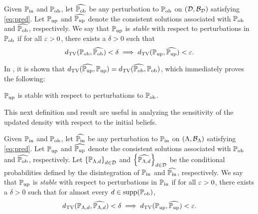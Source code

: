 \begin{defn}\label{defn:stableobs}
  Given $\operatorname*{\mathbb{P}_{in}}$ and $\operatorname*{\mathbb{P}_{ob}}$, let $\widehat{\operatorname*{\mathbb{P}_{ob}}}$ be any perturbation to $\operatorname*{\mathbb{P}_{ob}}$ on $(\mathcal{D}, \mathcal{B}_{\mathcal{D}})$ satisfying \eqref{eq:pred}.
  Let $\operatorname*{\mathbb{P}_{up}}$ and $\widehat{\operatorname*{\mathbb{P}_{up}}}$ denote the consistent solutions associated with $\operatorname*{\mathbb{P}_{ob}}$ and $\widehat{\operatorname*{\mathbb{P}_{ob}}}$, respectively.
  We say that $\operatorname*{\mathbb{P}_{up}}$ is \emph{stable} with respect to perturbations in $\operatorname*{\mathbb{P}_{ob}}$ if for all $\varepsilon > 0$, there exists a $\delta > 0$ such that
  \begin{equation}
    d_{\text{TV}} (\operatorname*{\mathbb{P}_{ob}}, \widehat{\operatorname*{\mathbb{P}_{ob}}}) < \delta \implies d_{\text{TV}} (\operatorname*{\mathbb{P}_{up}}, \widehat{\operatorname*{\mathbb{P}_{up}}}) < \varepsilon.
  \end{equation}
\end{defn}

In \cite{BJW18}, it is shown that $d_{\text{TV}} (\widehat{\operatorname*{\mathbb{P}_{up}}}, \operatorname*{\mathbb{P}_{up}}) = d_{\text{TV}} (\widehat{\operatorname*{\mathbb{P}_{ob}}}, \operatorname*{\mathbb{P}_{ob}})$, which immediately proves the following:

\begin{thm}
  $\operatorname*{\mathbb{P}_{up}}$ is stable with respect to perturbations to $\operatorname*{\mathbb{P}_{ob}}$.
  \label{thm:stableobs}
\end{thm}

This next definition and result are useful in analyzing the sensitivity of the updated density with respect to the initial beliefs.

\begin{defn}\label{defn:stableinitial}
  Given $\operatorname*{\mathbb{P}_{in}}$ and $\operatorname*{\mathbb{P}_{ob}}$, let $\widehat{\operatorname*{\mathbb{P}_{in}}}$ be any perturbation to $\operatorname*{\mathbb{P}_{in}}$ on $({\Lambda}, \mathcal{B}_{{\Lambda}})$ satisfying \eqref{eq:pred}.
  Let $\operatorname*{\mathbb{P}_{up}}$ and $\widehat{\operatorname*{\mathbb{P}_{up}}}$ denote the consistent solutions associated with $\operatorname*{\mathbb{P}_{ob}}$ and $\widehat{\operatorname*{\mathbb{P}_{ob}}}$, respectively.
  Let $\left\{\mathbb{P}_{{\Lambda}, d}\right\}_{d\in\mathcal{D}}^{}$ and $\left\{\widehat{\mathbb{P}_{{\Lambda}, d}}\right\}_{d\in\mathcal{D}}^{}$ be the conditional probabilities defined by the disintegration of $\operatorname*{\mathbb{P}_{in}}$ and $\widehat{\operatorname*{\mathbb{P}_{in}}}$, respectively.
  We say that $\operatorname*{\mathbb{P}_{up}}$ is \emph{stable} with respect to perturbations in $\operatorname*{\mathbb{P}_{in}}$ if for all $\varepsilon > 0$, there exists a $\delta > 0$ such that for almost every $d\in\text{supp}(\operatorname*{\mathbb{P}_{ob}})$,
  \begin{equation}\label{eq:stableinitial}
    d_{\text{TV}} (\mathbb{P}_{{\Lambda}, d}, \widehat{\mathbb{P}_{{\Lambda}, d}}) < \delta \implies d_{\text{TV}} (\operatorname*{\mathbb{P}_{up}}, \widehat{\operatorname*{\mathbb{P}_{up}}}) < \varepsilon.
  \end{equation}
\end{defn}

